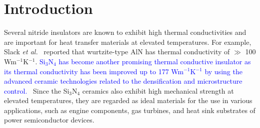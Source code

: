 \documentclass[twocolumn,amsmath,amssymb,a4paper,prb,superscriptaddress,floatfix]{revtex4-1}
\begin{document}
\maketitle

\section{Introduction}
Several nitride insulators are known to exhibit high thermal conductivities and
are important for heat transfer materials at elevated temperatures. For
example, Slack {\it et al.}~\cite{slack} reported that wurtzite-type AlN has
thermal conductivity of $\gg$  100 Wm$^{-1}$K$^{-1}$. \textcolor{blue}{Si$_3$N$_4$ has become
another promising thermal conductive insulator as its thermal conductivity has
been improved up to 177 Wm$^{-1}$K$^{-1}$ by using the advanced ceramic
technologies related to the densification and microstructure
control.~\cite{zhou,hirao-rev,watari,hirosaki}} Since the Si$_3$N$_4$ ceramics also
exhibit high mechanical strength at elevated temperatures, they are
regarded as ideal materials for the use in various applications, such as
engine components, gas turbines, and heat sink substrates of power
semiconductor devices.
\end{document}
